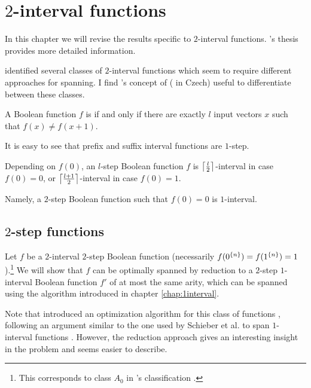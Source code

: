 \chapter{\texorpdfstring{$2$}{2}-interval functions}

In this chapter we will revise the results specific to
$2$-interval functions.
\dubovsky{}'s
thesis \cite{Dubovsky2012}
provides more detailed information.

\dubovsky{} identified several classes
of $2$-interval functions \cite[p.~5]{Dubovsky2012}
which seem to require different approaches for spanning.
I find \husek{}'s concept of
 \cite[p.~13]{Husek2014}
( in Czech)
useful to differentiate between these classes.

\begin{definition}
A Boolean function $f$ is 
if and only if
there are exactly $l$ input vectors $x$ such that
$f(x) \neq f(x+1)$.
\end{definition}

It is easy to see that
prefix and suffix interval functions are $1$-step.

Depending on $f(0)$,
an $l$-step Boolean function $f$
is $\ceil*{\frac{l}{2}}$-interval in case $f(0) = 0$,
or $\ceil*{\frac{l+1}{2}}$-interval in case $f(0) = 1$.

Namely,
a $2$-step Boolean function such that $f(0) = 0$
is $1$-interval.

\section{\texorpdfstring{$2$}{2}-step functions}

Let $f$ be a $2$-interval $2$-step Boolean function
(necessarily $f(\rep{0}{n}) = f(\rep{1}{n})
= 1$).\footnote{This corresponds to class $A_0$
in \dubovsky{}'s classification
\cite[p.~5]{Dubovsky2012}.}
We will show that $f$
can be optimally spanned by reduction to
a $2$-step $1$-interval Boolean function $f'$
of at most the same arity,
which can be spanned using the algorithm introduced
in chapter \ref{chap:1interval}.

Note that
\dubovsky{} introduced an optimization algorithm for
this class of functions \cite[section 3.2]{Dubovsky2012},
following an argument similar to the one used by
Schieber et al. to span $1$-interval functions
\cite{Schieber2005154}.
However,
the reduction approach gives
an interesting insight in the problem
and seems easier to describe.

